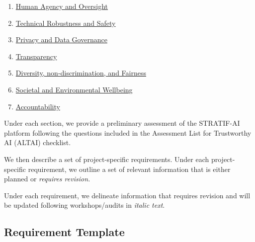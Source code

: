 \documentclass[
  letterpaper,
  DIV=11,
  numbers=noendperiod]{scrreport}
\providecommand{\tightlist}{%
  \setlength{\itemsep}{0pt}\setlength{\parskip}{0pt}}\usepackage{longtable,booktabs,array}
\begin{document}
\begin{enumerate}
\def\labelenumi{\arabic{enumi}.}
\tightlist
\item
  \protect\hyperlink{human-agency-and-oversight}{Human Agency and
  Oversight}
\item
  \protect\hyperlink{technical-robustness-and-safety}{Technical
  Robustness and Safety}
\item
  \protect\hyperlink{privacy-and-data-governance}{Privacy and Data
  Governance}
\item
  \protect\hyperlink{transparency}{Transparency}
\item
  \protect\hyperlink{diversity-non-discrimination-and-fairness}{Diversity,
  non-discrimination, and Fairness}
\item
  \protect\hyperlink{societal-and-environmental-well-being}{Societal and
  Environmental Wellbeing}
\item
  \protect\hyperlink{accountability}{Accountability}
\end{enumerate}

Under each section, we provide a preliminary assessment of the
STRATIF-AI platform following the questions included in the Assessment
List for Trustworthy AI (ALTAI) checklist.

We then describe a set of project-specific requirements. Under each
project-specific requirement, we outline a set of relevant information
that is either planned or \emph{requires revision.}

\begin{tcolorbox}[enhanced jigsaw, arc=.35mm, breakable, coltitle=black, toptitle=1mm, colbacktitle=quarto-callout-note-color!10!white, toprule=.15mm, left=2mm, bottomrule=.15mm, opacitybacktitle=0.6, titlerule=0mm, colback=white, opacityback=0, title=\textcolor{quarto-callout-note-color}{\faInfo}\hspace{0.5em}{Note}, bottomtitle=1mm, colframe=quarto-callout-note-color-frame, leftrule=.75mm, rightrule=.15mm]

Under each requirement, we delineate information that requires revision
and will be updated following workshops/audits in \emph{italic text}.

\end{tcolorbox}

\hypertarget{requirement-template}{%
\subsection*{Requirement Template}\label{requirement-template}}
\end{document}

